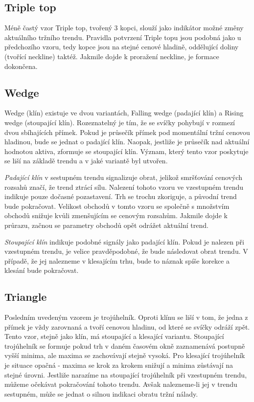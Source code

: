 \subsection{Triple top}
Méně častý vzor Triple top, tvořený 3 kopci, slouží jako indikátor možné změny aktuálního tržního trendu. Pravidla potvrzení Triple topu jsou podobná jako u předchozího vzoru, tedy
kopce jsou na stejné cenové hladině, oddělující doliny (tvořící neckline) taktéž. Jakmile dojde k proražení neckline, je formace dokončena. \iffalse TODO: Pridat \ref{} na obrazek \fi


\subsection{Wedge}
Wedge (klín) existuje ve dvou variantách, Falling wedge (padající klín) a Rising wedge (stoupající klín). Rozeznatelný je tím, že se svíčky pohybují v rozmezí dvou sbíhajících přímek.
Pokud je průsečík přímek pod momentální tržní cenovou hladinou, bude se jednat o padající klín. Naopak, jestliže je průsečík nad aktuální hodnotou aktiva, zformuje se stoupající klín.
Význam, který tento vzor poskytuje se liší na základě trendu a v jaké variantě byl utvořen.

\emph{Padající klín} v sestupném trendu signalizuje obrat, jelikož smršťování cenových rozsahů značí, že trend ztrácí sílu. Nalezení tohoto vzoru ve vzestupném trendu indikuje pouze
dočasné pozastavení. Trh se trochu zkoriguje, a původní trend bude pokračovat. Velikost obchodů v tomto vzoru se společně s množstvím obchodů snižuje kvůli zmenšujícím se cenovým
rozsahům. Jakmile dojde k průrazu, začnou se parametry obchodů opět odrážet aktuální trend. \iffalse TODO: Pridat \ref{} na obrazek \fi

\emph{Stoupající klín} indikuje podobné signály jako padající klín. Pokud je nalezen při vzestupném trendu, je velice pravděpodobné, že bude následovat obrat trendu. V případě, že jej
nalezneme v klesajícím trhu, bude to náznak spíše korekce a klesání bude pokračovat.

\subsection{Triangle}
Posledním uvedeným vzorem je trojúhelník. Oproti klínu se liší v tom, že jedna z přímek je vždy zarovnaná a tvoří cenovou hladinu, od které se svíčky odráží zpět. Tento vzor, stejně
jako klín, má stoupající a klesající variantu. Stoupající trojúhelník se formuje pokud trh v daném časovém okně zaznamenává postupně vyšší minima, ale maxima se zachovávají stejně vysoká.
Pro klesající trojúhelník je situace opačná - maxima se krok za krokem snižují a minima zůstávají na stejné úrovni. Jestliže narazíme na stoupající trojúhelník při vzestupném trendu,
můžeme očekávat pokračování tohoto trendu. Avšak nalezneme-li jej v trendu sestupném, může se jednat o silnou indikaci obratu tržní nálady.


